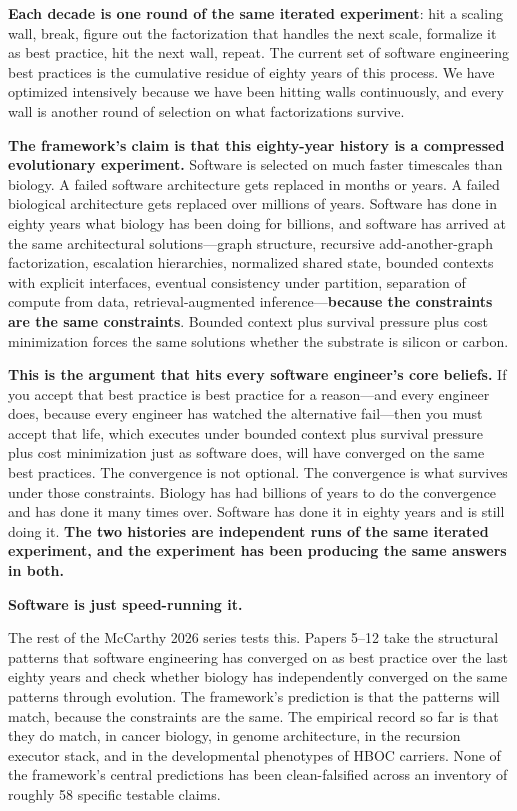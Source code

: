 \documentclass[11pt]{article}
\begin{document}
\textbf{Each decade is one round of the same iterated experiment}: hit a scaling wall, break, figure out the factorization that handles the next scale, formalize it as best practice, hit the next wall, repeat. The current set of software engineering best practices is the cumulative residue of eighty years of this process. We have optimized intensively because we have been hitting walls continuously, and every wall is another round of selection on what factorizations survive.

\textbf{The framework's claim is that this eighty-year history is a compressed evolutionary experiment.} Software is selected on much faster timescales than biology. A failed software architecture gets replaced in months or years. A failed biological architecture gets replaced over millions of years. Software has done in eighty years what biology has been doing for billions, and software has arrived at the same architectural solutions---graph structure, recursive add-another-graph factorization, escalation hierarchies, normalized shared state, bounded contexts with explicit interfaces, eventual consistency under partition, separation of compute from data, retrieval-augmented inference---\textbf{because the constraints are the same constraints}. Bounded context plus survival pressure plus cost minimization forces the same solutions whether the substrate is silicon or carbon.

\textbf{This is the argument that hits every software engineer's core beliefs.} If you accept that best practice is best practice for a reason---and every engineer does, because every engineer has watched the alternative fail---then you must accept that life, which executes under bounded context plus survival pressure plus cost minimization just as software does, will have converged on the same best practices. The convergence is not optional. The convergence is what survives under those constraints. Biology has had billions of years to do the convergence and has done it many times over. Software has done it in eighty years and is still doing it. \textbf{The two histories are independent runs of the same iterated experiment, and the experiment has been producing the same answers in both.}

\textbf{Software is just speed-running it.}

The rest of the McCarthy 2026 series tests this. Papers 5--12 take the structural patterns that software engineering has converged on as best practice over the last eighty years and check whether biology has independently converged on the same patterns through evolution. The framework's prediction is that the patterns will match, because the constraints are the same. The empirical record so far is that they do match, in cancer biology, in genome architecture, in the recursion executor stack, and in the developmental phenotypes of HBOC carriers. None of the framework's central predictions has been clean-falsified across an inventory of roughly 58 specific testable claims.
\end{document}
